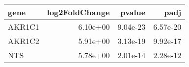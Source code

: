 \begin{tabular}{lrrr}
\toprule
  gene &  log2FoldChange &   pvalue &     padj \\
\midrule
AKR1C1 &        6.10e+00 & 9.04e-23 & 6.57e-20 \\
AKR1C2 &        5.91e+00 & 3.13e-19 & 9.92e-17 \\
   NTS &        5.78e+00 & 2.01e-14 & 2.28e-12 \\
\bottomrule
\end{tabular}
